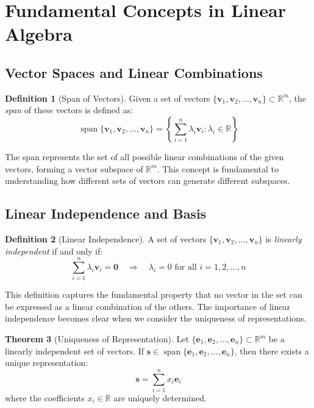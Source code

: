 \documentclass[12pt]{article}
\renewcommand{\vec}[1]{\mathbf{#1}}
\DeclareMathOperator{\spn}{span}
\newcommand{\R}{\mathbb{R}}
\theoremstyle{definition}
\newtheorem{theorem}{Theorem}[section]
\newtheorem{definition}[theorem]{Definition}
\begin{document}
\newpage

\section{Fundamental Concepts in Linear Algebra}

\subsection{Vector Spaces and Linear Combinations}

\begin{definition}[Span of Vectors]
    Given a set of vectors $\{\vec{v}_1, \vec{v}_2, \ldots, \vec{v}_n\} \subset \R^m$, the \textit{span} of these vectors is defined as:
    \begin{equation}
        \spn\{\vec{v}_1, \vec{v}_2, \ldots, \vec{v}_n\} = \left\{\sum_{i=1}^{n} \lambda_i \vec{v}_i : \lambda_i \in \R\right\}
    \end{equation}
\end{definition}

The span represents the set of all possible linear combinations of the given vectors, forming a vector subspace of $\R^m$. This concept is fundamental to understanding how different sets of vectors can generate different subspaces.

\subsection{Linear Independence and Basis}

\begin{definition}[Linear Independence]
    A set of vectors $\{\vec{v}_1, \vec{v}_2, \ldots, \vec{v}_n\}$ is \textit{linearly independent} if and only if:
    \begin{equation}
        \sum_{i=1}^{n} \lambda_i \vec{v}_i = \vec{0} \quad \Rightarrow \quad \lambda_i = 0 \text{ for all } i = 1, 2, \ldots, n
    \end{equation}
\end{definition}

This definition captures the fundamental property that no vector in the set can be expressed as a linear combination of the others. The importance of linear independence becomes clear when we consider the uniqueness of representations.

\begin{theorem}[Uniqueness of Representation]
    \label{thm:uniqueness}
    Let $\{\vec{e}_1, \vec{e}_2, \ldots, \vec{e}_n\} \subset \R^m$ be a linearly independent set of vectors. If $\vec{s} \in \spn\{\vec{e}_1, \vec{e}_2, \ldots, \vec{e}_n\}$, then there exists a unique representation:
    \begin{equation}
        \vec{s} = \sum_{i=1}^{n} x_i \vec{e}_i
    \end{equation}
    where the coefficients $x_i \in \R$ are uniquely determined.
\end{theorem}
\end{document}
